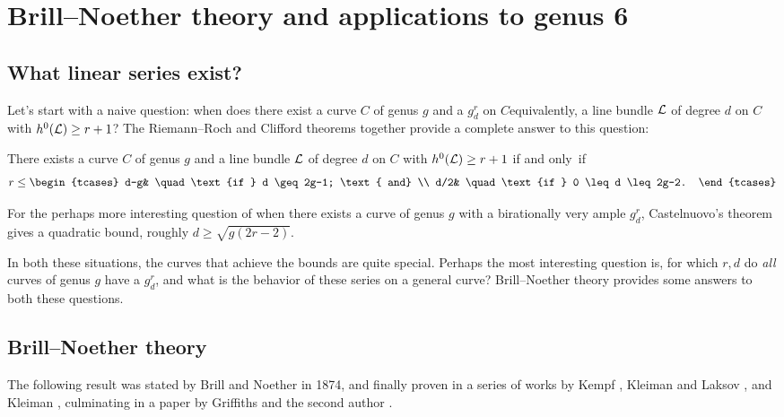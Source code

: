 

\chapter{Brill--Noether theory and applications to genus 6}\label{Brill--Noether}\label{BNChapter}

\section{What linear series exist?}

Let's start with a naive question: when does there exist a curve $C$
of genus $g$ and a $g^r_d$ on $C$\emdash equivalently, a line bundle
${\mathcal L}$ of degree $d$ on $C$ with $h^0({\mathcal L}) \geq r+1$? The
Riemann--Roch and
%
Clifford theorems
%
together provide a complete answer to this question:

\begin{theorem}\label{arbitrary linear series}
There exists a curve $C$ of genus $g$ and a line bundle ${\mathcal L}$ of degree $d$ on $C$ with $h^0({\mathcal L}) \geq r+1$ if and only~if
$$
r \leq
\begin{tcases}
d-g& \quad \text{if } d \geq 2g-1; \text{ and} \\
d/2&  \quad \text{if } 0 \leq d \leq 2g-2.
\end{tcases}
$$
\end{theorem}


For the
perhaps more interesting question of when  there
exists a curve of genus $g$ with a
birationally very ample $g^r_d$, Castelnuovo's theorem
%
%
%
gives a quadratic bound, roughly $d \geq
\sqrt{g(2r-2)}$.

In both these situations, the curves that achieve the bounds are quite
special. Perhaps the most interesting question
is, for which $r,d$ do \emph{all} curves of genus $g$ have a $g^r_d$,
and what is the
behavior of these series on a general curve?
%
Brill--Noether theory
provides some answers to both these questions.

\section{Brill--Noether theory}

The following result was stated by Brill and Noether in 1874, and finally
%
%
%
proven in a series of works by
Kempf
\citeyear{Kempf},
Kleiman and Laksov
%
%
%
%
\citeyear{MR323792,MR0357398},
and Kleiman \citeyear{Kleiman-special},
culminating in a paper by
Griffiths and the second author \cite{Griffiths-Harris-BN}.

